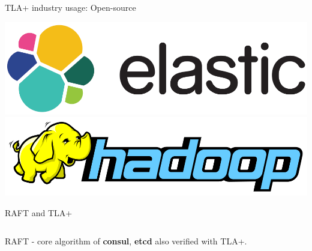 \documentclass[12pt]{beamer}
\begin{document}
\begin{frame}{TLA+ industry usage: Open-source}
\begin{center}
    \end{center}
    \begin{center}
        \includegraphics[scale=0.12]{figures/elastic}
        \includegraphics[scale=0.14]{figures/hadoop}
    \end{center}
  \end{frame}
  \begin{frame}{RAFT and TLA+}
    \begin{center}
          \inputminted[firstline=452,lastline=461,linenos,
            fontsize=\scriptsize]{tla}{figures/raft.tla}
    \end{center}
      RAFT - core algorithm of \textbf{consul}, \textbf{etcd} also verified
      with TLA+.
  \end{frame}
\end{document}
